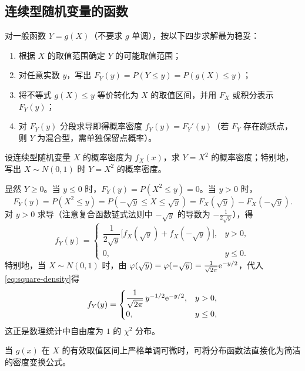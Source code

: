 \subsection{连续型随机变量的函数}

\begin{method}[求连续型随机变量函数分布的分布函数法]
对一般函数 $Y=g(X)$（不要求 $g$ 单调），按以下四步求解最为稳妥：
\begin{enumerate}
  \item 根据 $X$ 的取值范围确定 $Y$ 的可能取值范围；
  \item 对任意实数 $y$，写出 $F_Y(y)=P(Y\le y)=P(g(X)\le y)$；
  \item 将不等式 $g(X)\le y$ 等价转化为 $X$ 的取值区间，并用 $F_X$ 或积分表示 $F_Y(y)$；
  \item 对 $F_Y(y)$ 分段求导即得概率密度 $f_Y(y)=F_Y'(y)$（若 $F_Y$ 存在跳跃点，则 $Y$ 为混合型，需单独保留点概率）。
\end{enumerate}
\end{method}

\begin{example}[title={平方变换与自由度为 $1$ 的 $\chi^2$ 分布}]
\label{eg:square-transform}
设连续型随机变量 $X$ 的概率密度为 $f_X(x)$，求 $Y=X^2$ 的概率密度；特别地，写出 $X\sim N(0,1)$ 时 $Y=X^2$ 的概率密度。
\begin{solution}
显然 $Y\ge 0$。当 $y\le 0$ 时，$F_Y(y)=P(X^2\le y)=0$。当 $y>0$ 时，
\[
  F_Y(y)=P(X^2\le y)=P(-\sqrt{y}\le X\le\sqrt{y})=F_X(\sqrt{y})-F_X(-\sqrt{y}).
\]
对 $y>0$ 求导（注意复合函数链式法则中 $-\sqrt{y}$ 的导数为 $-\frac{1}{2\sqrt{y}}$），得
\begin{equation}
  f_Y(y)=
  \begin{cases}
    \dfrac{1}{2\sqrt{y}}\bigl[f_X(\sqrt{y})+f_X(-\sqrt{y})\bigr],& y>0,\\
    0,& y\le 0.
  \end{cases}
  \label{eq:square-density}
\end{equation}
特别地，当 $X\sim N(0,1)$ 时，由 $\varphi(\sqrt{y})=\varphi(-\sqrt{y})=\frac{1}{\sqrt{2\pi}}\mathrm{e}^{-y/2}$，代入\eqref{eq:square-density}得
\[
  f_Y(y)=
  \begin{cases}
    \dfrac{1}{\sqrt{2\pi}}\,y^{-1/2}\mathrm{e}^{-y/2},& y>0,\\
    0,& y\le 0,
  \end{cases}
\]
这正是数理统计中自由度为 $1$ 的 $\chi^2$ 分布。
\end{solution}
\end{example}

当 $g(x)$ 在 $X$ 的有效取值区间上严格单调可微时，可将分布函数法直接化为简洁的密度变换公式。

